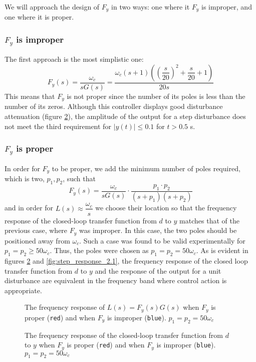 We will approach the design of $F_y$ in two ways: one where it $F_y$ is
improper, and one where it is proper.

\subsubsection{$F_y$ is improper}

The first approach is the most simplistic one:
$$F_y(s) = \dfrac{\omega_c}{sG(s)} = \dfrac{\omega_c (s+1)((\dfrac{s}{20})^2 + \dfrac{s}{20} + 1)}{20s}$$
This means that $F_y$ is not proper since the number of its poles is less than
the number of its zeros. Although this controller displays good disturbance
attenuation (figure \ref{fig:bode_2.1_dy}), the amplitude of the output for a
step disturbance does not meet the third requirement for $|y(t)| \leq 0.1$ for
$t > 0.5$ s.

\subsubsection{$F_y$ is proper}

In order for $F_y$ to be proper, we add the minimum number of poles required,
which is two, $p_1, p_2$, such that
$$F_y(s) = \dfrac{\omega_c}{sG(s)} \cdot \dfrac{p_1 \cdot p_2}{(s+p_1)(s+p_2)}$$
and in order for $L(s) \approx \dfrac{\omega_c}{s}$ we choose their location
so that the frequency response of the closed-loop transfer function from $d$ to
$y$ matches that of the previous case, where $F_y$ was improper. In this case,
the two poles should be positioned away from $\omega_c$. Such a case was
found to be valid experimentally for $p_1 = p_2 \geq 50\omega_c$. Thus, the
poles were chosen as $p_1 = p_2 = 50\omega_c$. As is evident in figures
\ref{fig:bode_2.1_dy} and \ref{fig:step_response_2.1}, the frequency response of
the closed loop transfer function from $d$ to $y$ and the response of the output
for a unit disturbance are equivalent in the frequency band where control action
is appropriate.


\begin{figure}[H]\centering
  \scalebox{1}{}
  \caption{The frequency response of $L(s) = F_y(s)G(s)$ when $F_y$ is proper
    (\texttt{red}) and when $F_y$ is improper (\texttt{blue}).
    $p_1 = p_2 = 50\omega_c$}
  \label{fig:bode_2.1_L}
\end{figure}

\begin{figure}[H]\centering
  \scalebox{1}{}
  \caption{The frequency response of the closed-loop transfer function from $d$
    to $y$ when $F_y$ is proper (\texttt{red}) and when $F_y$ is improper
    (\texttt{blue}). $p_1 = p_2 = 50\omega_c$}
  \label{fig:bode_2.1_dy}
\end{figure}

